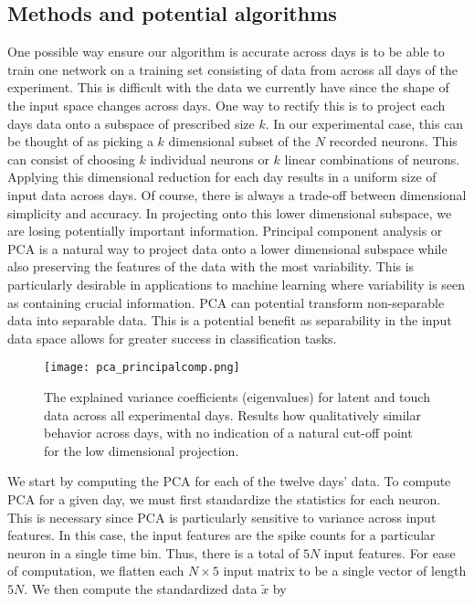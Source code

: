 \documentclass[12pt]{article}
\begin{document}
\subsection{Methods and potential algorithms}
One possible way ensure our algorithm is accurate across days is to be able to train one network on a training set consisting of data from across all days of the experiment. This is difficult with the data we currently have since the shape of the input space changes across days. One way to rectify this is to project each days data onto a subspace of prescribed size $k$. In our experimental case, this can be thought of as picking a $k$ dimensional subset of the $N$ recorded neurons. This can consist of choosing $k$ individual neurons or $k$ linear combinations of neurons. Applying this dimensional reduction for each day results in a uniform size of input data across days. Of course, there is always a trade-off between dimensional simplicity and accuracy. In projecting onto this lower dimensional subspace, we are losing potentially important information. Principal component analysis or PCA is a natural way to project data onto a lower dimensional subspace while also preserving the features of the data with the most variability. This is particularly desirable in applications to machine learning where variability is seen as containing crucial information. PCA can potential transform non-separable data into separable data. This is a potential benefit as separability in the input data space allows for greater success in classification tasks.\\
\begin{figure}
  \centering
 \texttt{[image: pca\_principalcomp.png]}
 \caption{The explained variance coefficients (eigenvalues) for latent and touch data across all experimental days. Results how qualitatively similar behavior across days, with no indication of a natural cut-off point for the low dimensional projection.}
 \label{ref:pca}
 \end{figure}
We start by computing the PCA for each of the twelve days' data. To compute PCA for a given day, we must first standardize the statistics for each neuron. This is necessary since PCA is particularly sensitive to variance across input features. In this case, the input features are the spike counts for a particular neuron in a single time bin. Thus, there is a total of $5N$ input features.  For ease of computation, we  flatten each $N\times5$ input matrix to be a single vector of length $5N$.  We then compute the standardized data $\tilde{x}$ by
\end{document}
